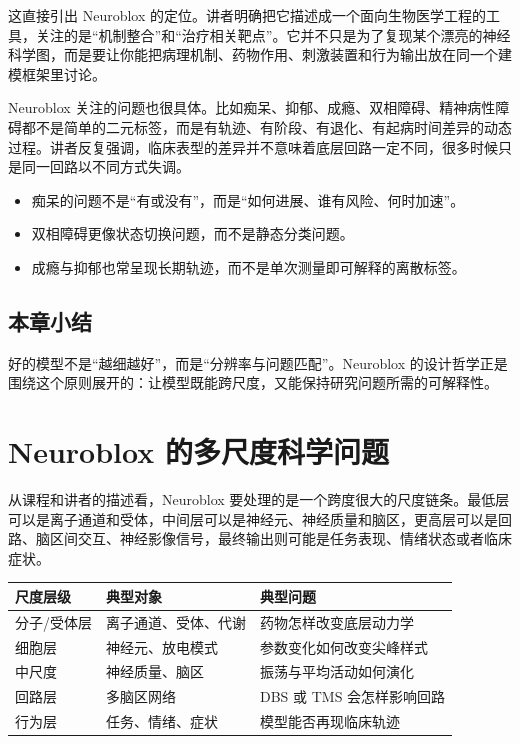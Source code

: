 \documentclass[a4paper]{article}
\begin{document}
这直接引出 Neuroblox 的定位。讲者明确把它描述成一个面向生物医学工程的工具，关注的是“机制整合”和“治疗相关靶点”。它并不只是为了复现某个漂亮的神经科学图，而是要让你能把病理机制、药物作用、刺激装置和行为输出放在同一个建模框架里讨论。

Neuroblox 关注的问题也很具体。比如痴呆、抑郁、成瘾、双相障碍、精神病性障碍都不是简单的二元标签，而是有轨迹、有阶段、有退化、有起病时间差异的动态过程。讲者反复强调，临床表型的差异并不意味着底层回路一定不同，很多时候只是同一回路以不同方式失调。

\begin{itemize}
  \item 痴呆的问题不是“有或没有”，而是“如何进展、谁有风险、何时加速”。
  \item 双相障碍更像状态切换问题，而不是静态分类问题。
  \item 成瘾与抑郁也常呈现长期轨迹，而不是单次测量即可解释的离散标签。
\end{itemize}

\subsection{本章小结}
好的模型不是“越细越好”，而是“分辨率与问题匹配”。Neuroblox 的设计哲学正是围绕这个原则展开的：让模型既能跨尺度，又能保持研究问题所需的可解释性。

\section{Neuroblox 的多尺度科学问题}
从课程和讲者的描述看，Neuroblox 要处理的是一个跨度很大的尺度链条。最低层可以是离子通道和受体，中间层可以是神经元、神经质量和脑区，更高层可以是回路、脑区间交互、神经影像信号，最终输出则可能是任务表现、情绪状态或者临床症状。

\begin{center}
\begin{tabular}{@{}lll@{}}
\toprule
尺度层级 & 典型对象 & 典型问题 \\
\midrule
分子/受体层 & 离子通道、受体、代谢 & 药物怎样改变底层动力学 \\
细胞层 & 神经元、放电模式 & 参数变化如何改变尖峰样式 \\
中尺度 & 神经质量、脑区 & 振荡与平均活动如何演化 \\
回路层 & 多脑区网络 & DBS 或 TMS 会怎样影响回路 \\
行为层 & 任务、情绪、症状 & 模型能否再现临床轨迹 \\
\bottomrule
\end{tabular}
\end{center}
\end{document}
